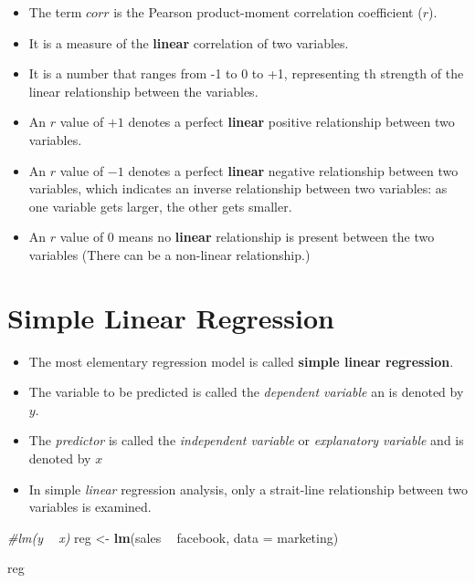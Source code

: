 \documentclass[]{book}
\newenvironment{Shaded}{\begin{snugshade}}{\end{snugshade}}
\newcommand{\CommentTok}[1]{\textcolor[rgb]{0.56,0.35,0.01}{\textit{#1}}}
\newcommand{\DataTypeTok}[1]{\textcolor[rgb]{0.13,0.29,0.53}{#1}}
\newcommand{\KeywordTok}[1]{\textcolor[rgb]{0.13,0.29,0.53}{\textbf{#1}}}
\newcommand{\NormalTok}[1]{#1}
\newcommand{\OperatorTok}[1]{\textcolor[rgb]{0.81,0.36,0.00}{\textbf{#1}}}
\newcommand{\StringTok}[1]{\textcolor[rgb]{0.31,0.60,0.02}{#1}}
\providecommand{\tightlist}{%
  \setlength{\itemsep}{0pt}\setlength{\parskip}{0pt}}
\begin{document}
\begin{itemize}
\tightlist
\item
  The term \(corr\) is the Pearson product-moment correlation coefficient (\(r\)).
\item
  It is a measure of the \textbf{linear} correlation of two variables.
\item
  It is a number that ranges from -1 to 0 to +1, representing th strength of the linear relationship between the variables.
\item
  An \(r\) value of \(+1\) denotes a perfect \textbf{linear} positive relationship between two variables.
\item
  An \(r\) value of \(-1\) denotes a perfect \textbf{linear} negative relationship between two variables, which indicates an inverse relationship between two variables: as one variable gets larger, the other gets smaller.
\item
  An \(r\) value of 0 means no \textbf{linear} relationship is present between the two variables (There can be a non-linear relationship.)
\end{itemize}

\hypertarget{simple-linear-regression}{%
\section{Simple Linear Regression}\label{simple-linear-regression}}

\begin{itemize}
\item
  The most elementary regression model is called \textbf{simple linear regression}.
\item
  The variable to be predicted is called the \emph{dependent variable} an is denoted by \(y\).
\item
  The \emph{predictor} is called the \emph{independent variable} or \emph{explanatory variable} and is denoted by \(x\)
\item
  In simple \emph{linear} regression analysis, only a strait-line relationship between two variables is examined.
\end{itemize}

\begin{Shaded}
\begin{Highlighting}[]
\CommentTok{#lm(y ~ x)}
\NormalTok{reg <-}\StringTok{ }\KeywordTok{lm}\NormalTok{(sales }\OperatorTok{~}\StringTok{ }\NormalTok{facebook,  }\DataTypeTok{data =}\NormalTok{ marketing)}

\NormalTok{reg}
\end{Highlighting}
\end{Shaded}
\end{document}
